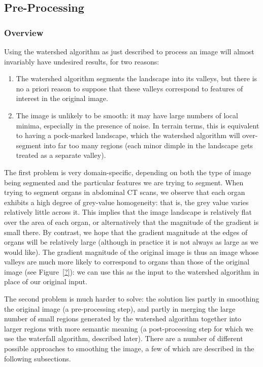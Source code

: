 
\subsection{Pre-Processing}

\subsubsection{Overview}

Using the watershed algorithm as just described to process an image will almost invariably have undesired results, for two reasons:
%
\begin{enumerate}
\item The watershed algorithm segments the landscape into its valleys, but there is no a priori reason to suppose that these valleys correspond to features of interest in the original image.
\item The image is unlikely to be smooth: it may have large numbers of local minima, especially in the presence of noise. In terrain terms, this is equivalent to having a pock-marked landscape, which the watershed algorithm will over-segment into far too many regions (each minor dimple in the landscape gets treated as a separate valley).
\end{enumerate}
%
The first problem is very domain-specific, depending on both the type of image being segmented and the particular features we are trying to segment. When trying to segment organs in abdominal CT scans, we observe that each organ exhibits a high degree of grey-value homogeneity: that is, the grey value varies relatively little across it. This implies that the image landscape is relatively flat over the area of each organ, or alternatively that the magnitude of the gradient is small there. By contrast, we hope that the gradient magnitude at the edges of organs will be relatively large (although in practice it is not always as large as we would like). The gradient magnitude of the original image is thus an image whose valleys are much more likely to correspond to organs than those of the original image (see Figure~\ref{?}): we can use this as the input to the watershed algorithm in place of our original input.

The second problem is much harder to solve: the solution lies partly in smoothing the original image (a pre-processing step), and partly in merging the large number of small regions generated by the watershed algorithm together into larger regions with more semantic meaning (a post-processing step for which we use the waterfall algorithm, described later). There are a number of different possible approaches to smoothing the image, a few of which are described in the following subsections.

